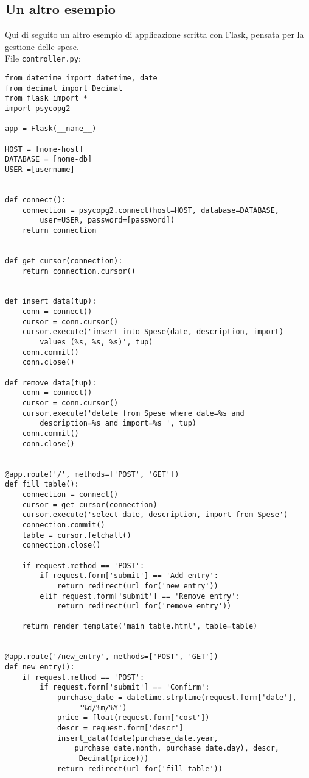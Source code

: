 \documentclass[a4paper, 10pt, titlepage]{article}
\begin{document}
		\subsection{Un altro esempio}
		Qui di seguito un altro esempio di applicazione scritta con Flask, pensata per la gestione delle spese. \\
		File \verb|controller.py|:
		\lstset{language=Python}

		\begin{lstlisting}[frame=tb,tabsize=2]
from datetime import datetime, date
from decimal import Decimal
from flask import *
import psycopg2

app = Flask(__name__)

HOST = [nome-host]
DATABASE = [nome-db]
USER =[username]


def connect():
	connection = psycopg2.connect(host=HOST, database=DATABASE, 
		user=USER, password=[password])
	return connection


def get_cursor(connection):
	return connection.cursor()


def insert_data(tup):
	conn = connect()
	cursor = conn.cursor()
	cursor.execute('insert into Spese(date, description, import)
		values (%s, %s, %s)', tup)
	conn.commit()
	conn.close()

def remove_data(tup):
	conn = connect()
	cursor = conn.cursor()
	cursor.execute('delete from Spese where date=%s and 
		description=%s and import=%s ', tup)
	conn.commit()
	conn.close()


@app.route('/', methods=['POST', 'GET'])
def fill_table():
	connection = connect()
	cursor = get_cursor(connection)
	cursor.execute('select date, description, import from Spese')
	connection.commit()
	table = cursor.fetchall()
	connection.close()

	if request.method == 'POST':
		if request.form['submit'] == 'Add entry':
			return redirect(url_for('new_entry'))
		elif request.form['submit'] == 'Remove entry':
			return redirect(url_for('remove_entry'))

	return render_template('main_table.html', table=table)


@app.route('/new_entry', methods=['POST', 'GET'])
def new_entry():
	if request.method == 'POST':
		if request.form['submit'] == 'Confirm':
			purchase_date = datetime.strptime(request.form['date'],
				 '%d/%m/%Y')
			price = float(request.form['cost'])
			descr = request.form['descr']
			insert_data((date(purchase_date.year, 
				purchase_date.month, purchase_date.day), descr,
				 Decimal(price)))
			return redirect(url_for('fill_table'))
	

\end{lstlisting}
\end{document}
